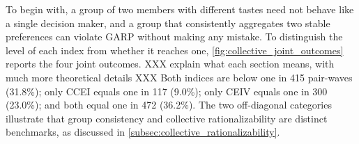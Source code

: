 \documentclass[11 pt]{article}
\begin{document}

To begin with, a group of two members with different tastes need not behave like a single decision maker, and a group that consistently aggregates two stable preferences can violate GARP without making any mistake. To distinguish the level of each index from whether it reaches one, \autoref{fig:collective_joint_outcomes} reports the four joint outcomes. XXX explain what each section means, with much more theoretical details XXX Both indices are below one in 415 pair-waves (31.8\%); only CCEI equals one in 117 (9.0\%); only CEIV equals one in 300 (23.0\%); and both equal one in 472 (36.2\%). The two off-diagonal categories illustrate that group consistency and collective rationalizability are distinct benchmarks, as discussed in \autoref{subsec:collective_rationalizability}.
\end{document}
